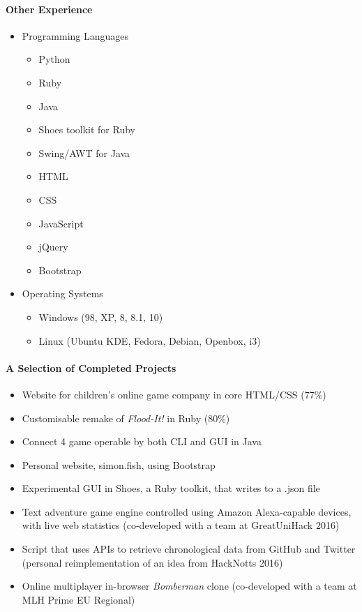 \documentclass{article}
\begin{document}
\paragraph{Other Experience}
\begin{itemize}
	\item Programming Languages
		\begin{itemize}
	\item Python
	\item Ruby
	\item Java
	\item Shoes toolkit for Ruby
	\item Swing/AWT for Java
	\item HTML
	\item CSS
	\item JavaScript
	\item jQuery
	\item Bootstrap
		\end{itemize}
\end{itemize}
\begin{itemize}
	\item Operating Systems 
		\begin{itemize}
			\item Windows (98, XP, 8, 8.1, 10)
			\item Linux (Ubuntu KDE, Fedora, Debian, Openbox, i3)
		\end{itemize}
\end{itemize}
\paragraph{A Selection of Completed Projects}
\begin{itemize}
  \item Website for children's online game company in core HTML/CSS (77\%) 
  \item Customisable remake of \textit{Flood-It!} in Ruby (80\%) 
  \item Connect 4 game operable by both CLI and GUI in Java
  \item Personal website, simon.fish, using Bootstrap
  \item Experimental GUI in Shoes, a Ruby toolkit, that writes to a .json file
  \item Text adventure game engine controlled using Amazon Alexa-capable devices, with live web statistics (co-developed with a team at GreatUniHack 2016)
  \item Script that uses APIs to retrieve chronological data from GitHub and Twitter (personal reimplementation of an idea from HackNotts 2016)
  \item Online multiplayer in-browser \textit{Bomberman} clone (co-developed with a team at MLH Prime EU Regional)
\end{itemize}
\end{document}
